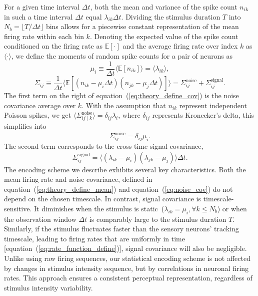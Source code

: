 For a given time interval \(\Delta t\), both the mean and variance of the spike count \(n_{ik}\) in such a time interval \(\Delta t\) equal \(\lambda_{ik}\Delta t\).
Dividing the stimulus duration \(T\) into \(N_b = \lfloor T / \Delta t \rfloor\) bins allows for a piecewise constant representation of the mean firing rate within each bin \(k\).
Denoting the expected value of the spike count conditioned on the firing rate as \(\mathbb{E}[\cdot]\) and the average firing rate over index \(k\) as \(\langle \cdot \rangle\), we define the moments of random spike counts for a pair of neurons as
\begin{equation}
    \mu_i \equiv \frac{1}{\Delta t}\langle \mathbb{E}[n_{ik}] \rangle = \langle \lambda_{ik}\rangle,
    \label{eq:theory_define_mean}
\end{equation}
\begin{equation}
    \Sigma_{ij} \equiv \frac{1}{\Delta t}\langle \mathbb{E}[(n_{ik} - \mu_i\Delta t)(n_{jk} - \mu_j\Delta t)]\rangle  =  \Sigma^{\text{noise}}_{ij} + \Sigma^{\text{signal}}_{ij}.
    \label{eq:theory_define_cov}
\end{equation}
The first term on the right of equation~(\ref{eq:theory_define_cov}) is the noise covariance average over \(k\).
With the assumption that \(n_{ik}\) represent independent Poisson spikes, we get $\langle \Sigma_{ij\mid k}^{\text{noise}}\rangle = \delta_{ij}\lambda_i$,
where $\delta_{ij}$ represents Kronecker's delta, this simplifies into
\begin{equation}
    \Sigma_{ij}^{\text{noise}} = \delta_{ij}\mu_i.
    \label{eq:noise_cov}
\end{equation}
The second term corresponds to the cross-time signal covariance,
\begin{equation}
    \Sigma^{\text{signal}}_{ij} =  \langle(\lambda_{ik} - \mu_i)(\lambda_{jk} - \mu_j )\rangle \Delta t.
    \label{eq:signal_cov}
\end{equation}
The encoding scheme we describe exhibits several key characteristics.  
Both the mean firing rate and noise covariance, defined in equation~(\ref{eq:theory_define_mean}) and equation~(\ref{eq:noise_cov}) do not depend on the chosen timescale. 
In contrast, signal covariance is timescale-sensitive.
It diminishes when the stimulus is static~(\(\lambda_{ik} = \mu_i, \forall k \leq N_b\)) or when the observation window \(\Delta t\) is comparably large to the stimulus duration \(T\).
Similarly, if the stimulus fluctuates faster than the sensory neurons' tracking timescale, leading to firing rates that are uniformly in time [equation~(\ref{eq:rate_function_define})], signal covariance will also be negligible.
Unlike using raw firing sequences, our statistical encoding scheme is not affected by changes in stimulus intensity sequence, but by correlations in neuronal firing rates. This approach ensures a consistent perceptual representation, regardless of stimulus intensity variability.

